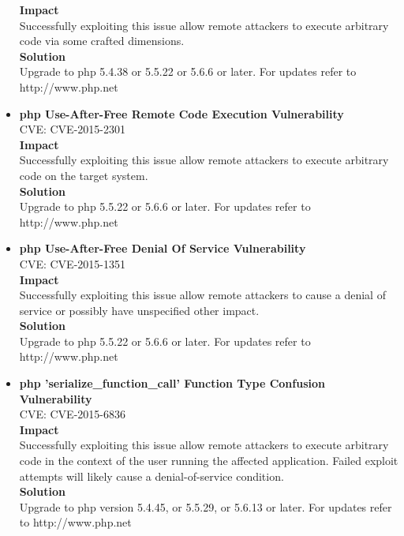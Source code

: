 \begin{itemize}
\textbf{Impact} \\
Successfully exploiting this issue allow remote attackers to execute arbitrary code via some crafted dimensions.\\

\textbf{Solution}\\
Upgrade to php 5.4.38 or 5.5.22 or 5.6.6 or later. For updates refer to http://www.php.net\\

\item \textbf{php Use-After-Free Remote Code Execution Vulnerability } \\
CVE: CVE-2015-2301\\

\textbf{Impact} \\
Successfully exploiting this issue allow remote attackers to execute arbitrary code on the target system.\\

\textbf{Solution}\\
Upgrade to php 5.5.22 or 5.6.6 or later. For updates refer to http://www.php.net

\item \textbf{php Use-After-Free Denial Of Service Vulnerability} \\
CVE: CVE-2015-1351\\

\textbf{Impact} \\
Successfully exploiting this issue allow remote attackers to cause a denial of service or possibly have unspecified other impact.\\

\textbf{Solution}\\
Upgrade to php 5.5.22 or 5.6.6 or later. For updates refer to http://www.php.net\\

\item \textbf{php 'serialize\_function\_call' Function Type Confusion Vulnerability} \\
CVE: CVE-2015-6836\\

\textbf{Impact} \\
Successfully exploiting this issue allow remote attackers to execute arbitrary code in the context of the user running the affected application. Failed exploit attempts will likely cause a denial-of-service condition.\\


\textbf{Solution}\\
Upgrade to php version 5.4.45, or 5.5.29, or 5.6.13 or later. For updates refer to http://www.php.net\\


\end{itemize}
